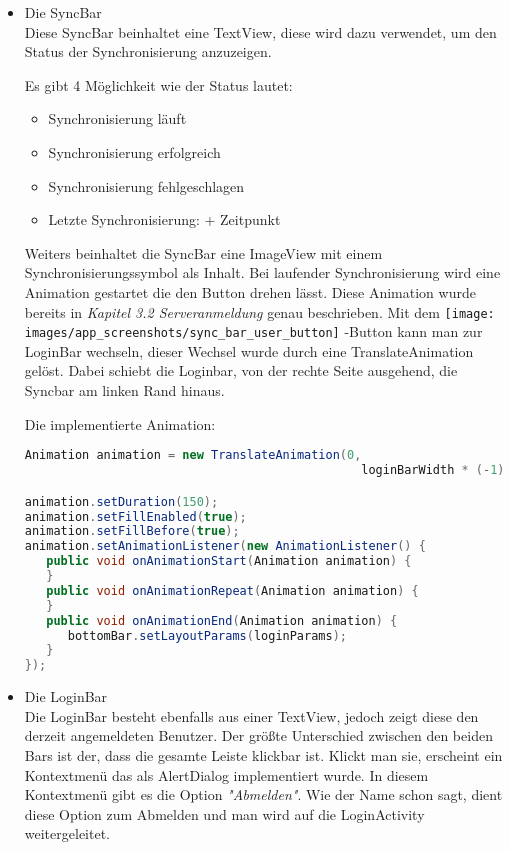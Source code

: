 \begin{itemize}

\item{Die SyncBar}\\
Diese SyncBar beinhaltet eine TextView, diese wird dazu verwendet, um den Status der Synchronisierung anzuzeigen. 

Es gibt 4 Möglichkeit wie der Status lautet:
\begin{itemize}
\item{Synchronisierung läuft}
\item{Synchronisierung erfolgreich}
\item{Synchronisierung fehlgeschlagen}
\item{Letzte Synchronisierung: + Zeitpunkt}
\end{itemize}
Weiters beinhaltet die SyncBar eine ImageView mit einem Synchronisierungssymbol als Inhalt. Bei laufender Synchronisierung wird eine Animation gestartet die den Button drehen lässt. Diese Animation wurde bereits in \textit{ Kapitel 3.2 Serveranmeldung} genau beschrieben. 
Mit dem \texttt{[image: images/app\_screenshots/sync\_bar\_user\_button]} -Button kann man zur LoginBar wechseln, dieser Wechsel wurde durch eine TranslateAnimation gelöst. Dabei schiebt die Loginbar, von der rechte Seite ausgehend, die Syncbar am linken Rand hinaus.

Die implementierte Animation:

\begin{lstlisting}[language=java, captionpos=b, caption={Die Animation zum Wechsel der StatusBarViews}]
Animation animation = new TranslateAnimation(0, 
                                               loginBarWidth * (-1), 0, 0);

animation.setDuration(150);
animation.setFillEnabled(true);
animation.setFillBefore(true);
animation.setAnimationListener(new AnimationListener() {
   public void onAnimationStart(Animation animation) {
   }
   public void onAnimationRepeat(Animation animation) {
   }
   public void onAnimationEnd(Animation animation) {
      bottomBar.setLayoutParams(loginParams);
   }
});
\end{lstlisting}
 

\item{Die LoginBar}\\
Die LoginBar besteht ebenfalls aus einer TextView, jedoch zeigt diese den derzeit angemeldeten Benutzer. Der größte Unterschied zwischen den beiden Bars ist der, dass die gesamte Leiste klickbar ist. Klickt man sie, erscheint ein Kontextmenü das als AlertDialog implementiert wurde. In diesem Kontextmenü gibt es die Option \textit{"Abmelden"}. Wie der Name schon sagt, dient diese Option zum Abmelden und man wird auf die LoginActivity weitergeleitet.


\end{itemize}
